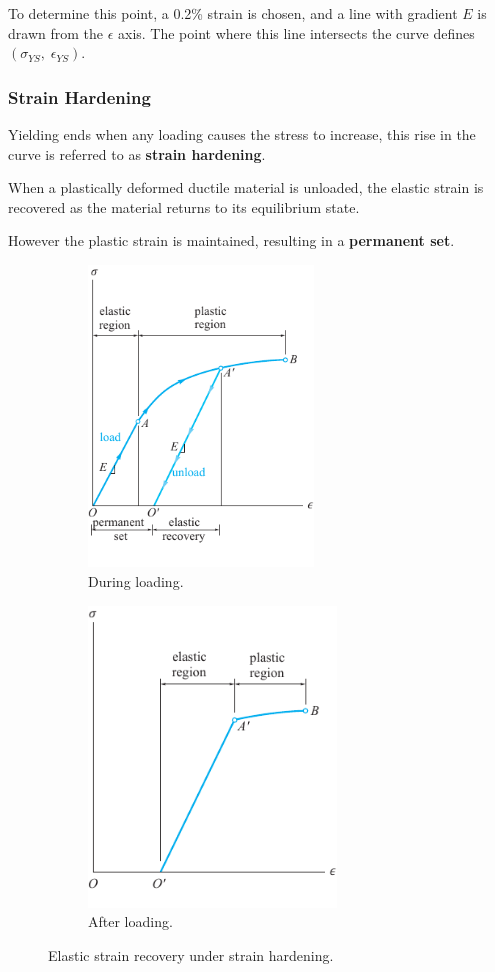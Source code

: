 \documentclass{article}
\begin{document}
To determine this point, a 0.2\% strain is chosen, and a line with gradient \(E\) is drawn
from the \(\epsilon\) axis.
The point where this line intersects the curve defines \(\left( \sigma_{YS},\; \epsilon_{YS} \right)\).
\subsubsection{Strain Hardening}
Yielding ends when any loading causes the stress
to increase, this rise in the curve is referred to as \textbf{strain hardening}.

When a plastically deformed ductile material is unloaded,
the elastic strain is recovered as the material returns to its equilibrium state.

However the plastic strain is maintained, resulting in a \textbf{permanent set}.
\begin{figure}[H]
    \centering
    \begin{subfigure}[H]{0.49\linewidth}
        \centering
        \includegraphics[height = 8cm, keepaspectratio = true]{figures/strain_hardening.pdf}
        \caption{During loading.}
    \end{subfigure}
    \begin{subfigure}[H]{0.49\linewidth}
        \centering
        \includegraphics[height = 8cm, keepaspectratio = true]{figures/strain_hardening_recovery.pdf}
        \caption{After loading.}
    \end{subfigure}
    \caption{Elastic strain recovery under strain hardening.}
\end{figure}
\end{document}
